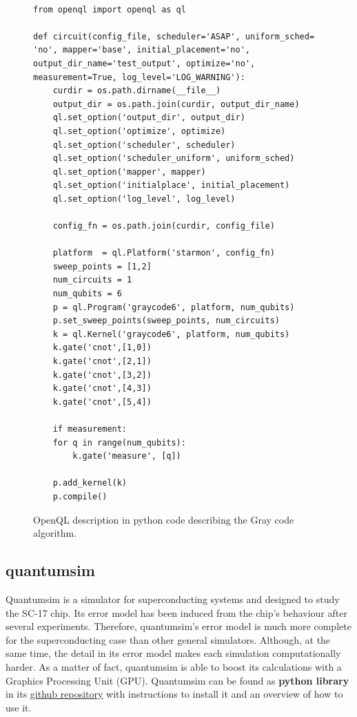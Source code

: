\begin{figure}
\centering
\begin{minipage}{\textwidth}

\begin{verbatim}

from openql import openql as ql

def circuit(config_file, scheduler='ASAP', uniform_sched= 'no', mapper='base', initial_placement='no', output_dir_name='test_output', optimize='no', measurement=True, log_level='LOG_WARNING'):
    curdir = os.path.dirname(__file__)
    output_dir = os.path.join(curdir, output_dir_name)
    ql.set_option('output_dir', output_dir)
    ql.set_option('optimize', optimize)
    ql.set_option('scheduler', scheduler)
    ql.set_option('scheduler_uniform', uniform_sched)
    ql.set_option('mapper', mapper)
    ql.set_option('initialplace', initial_placement)
    ql.set_option('log_level', log_level)

    config_fn = os.path.join(curdir, config_file)

    platform  = ql.Platform('starmon', config_fn)
    sweep_points = [1,2]
    num_circuits = 1
    num_qubits = 6
    p = ql.Program('graycode6', platform, num_qubits)
    p.set_sweep_points(sweep_points, num_circuits)
    k = ql.Kernel('graycode6', platform, num_qubits)
    k.gate('cnot',[1,0])
    k.gate('cnot',[2,1])
    k.gate('cnot',[3,2])
    k.gate('cnot',[4,3])
    k.gate('cnot',[5,4])

    if measurement:
	for q in range(num_qubits):
	    k.gate('measure', [q])

    p.add_kernel(k)
    p.compile()

\end{verbatim}

\caption{OpenQL description in python code describing the Gray code algorithm.}
\label{code:openql_gray_code}
\end{minipage}
\end{figure}

\subsection*{quantumsim}
\label{sec:org1be9b29}

Quantumsim \cite{O_Brien_2017} is a simulator for superconducting systems and designed to study the SC-17 chip.
Its error model has been induced from the chip's behaviour after several experiments.
Therefore, quantumsim's error model is much more complete for the superconducting case than other general simulators.
Although, at the same time, the detail in its error model makes each simulation computationally harder.
As a matter of fact, quantumsim is able to boost its calculations with a Graphics Processing Unit (GPU).
Quantumsim can be found as \textbf{python library} in its \href{https://github.com/quantumsim/quantumsim}{github repository} with instructions to install it and an overview of how to use it.

